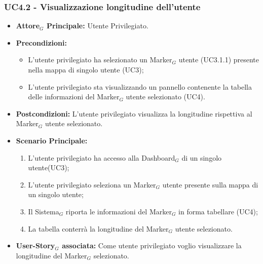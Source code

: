 \documentclass[10pt]{article}
\begin{document}
\begin{justify}
\subsubsection{\textbf{UC4.2 - Visualizzazione longitudine dell'utente}}
\label{UC4.2}
\begin{itemize}
     \item \textbf{Attore$_G$ Principale:} Utente Privilegiato.
     \item \textbf{Precondizioni:}
        \begin{itemize}
          \item L'utente privilegiato ha selezionato un Marker$_G$ utente (UC3.1.1) presente nella mappa di singolo utente (UC3);
          \item L'utente privilegiato sta visualizzando un pannello contenente la tabella delle informazioni del Marker$_G$ utente selezionato (UC4).
        \end{itemize}
      \item \textbf{Postcondizioni:} L'utente privilegiato visualizza la longitudine rispettiva al Marker$_G$ utente selezionato. 
      \item \textbf{Scenario Principale:}
        \begin{enumerate}
            \item L'utente privilegiato ha accesso alla Dashboard$_G$ di un singolo utente(UC3);
            \item L'utente privilegiato seleziona un Marker$_G$ utente presente sulla mappa di un singolo utente;
            \item Il Sistema$_G$ riporta le informazioni del Marker$_G$ in forma tabellare (UC4);
            \item La tabella conterrà la longitudine del Marker$_G$ utente selezionato.
        \end{enumerate}
     \item \textbf{User-Story$_G$ associata:}
       Come utente privilegiato voglio visualizzare la longitudine del Marker$_G$ selezionato.
\end{itemize}


\end{justify}
\end{document}
